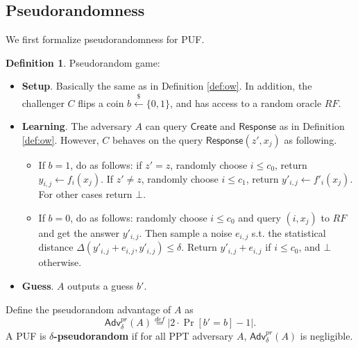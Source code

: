 \documentclass[12pt]{article}
\newcommand{\eqdef}{\stackrel{def}{=}}
\newcommand{\bits}{\{0,1\}}
\newcommand{\getsr}{\stackrel{\$}{\gets}}
\newcommand{\Adv}{\mathsf{Adv}}
\newcommand{\Create}{\mathsf{Create}}
\newcommand{\Response}{\mathsf{Response}}
\theoremstyle{definition}
\newtheorem{definition}[theorem]{Definition}
\begin{document}
\subsection{Pseudorandomness}
We first formalize pseudorandomness for PUF.
\begin{definition}
Pseudorandom game:
\begin{itemize}
\item {\bf Setup}. Basically the same as in Definition \ref{def:ow}. In addition, the challenger $C$ flips a coin $b \getsr \bits$, and has access to a random oracle $RF$.
\item {\bf Learning}. The adversary $A$ can query $\Create$ and $\Response$ as in Definition \ref{def:ow}. However, $C$ behaves on the query $\Response(z', x_j)$ as following.
	\begin{itemize}
	\item If $b=1$, do as follows: if $z'=z$, randomly choose $i \leq c_0$, return $y_{i,j} \gets f_i(x_j)$. If $z'\not= z$, randomly choose $i \leq c_1$, return $y'_{i,j} \gets f'_i(x_j)$. For other cases return $\bot$.
	\item If $b=0$, do as follows: randomly choose $i \leq c_0$ and query $(i, x_j)$ to $RF$ and get the answer $y'_{i,j}$. Then sample a noise $e_{i,j}$ s.t. the statistical distance $\Delta(y'_{i,j} + e_{i,j}, y'_{i,j}) \leq \delta$. Return $y'_{i,j} + e_{i,j}$ if $i\leq c_0$, and $\bot$ otherwise.
	\end{itemize}
\item {\bf Guess}. $A$ outputs a guess $b'$.
\end{itemize}
Define the pseudorandom advantage of $A$ as
$$\Adv_{\delta}^{pr}(A) \eqdef |2\cdot \Pr[b'=b] - 1|.$$
A PUF is {\bf $\delta$-pseudorandom} if for all PPT adversary $A$, $\Adv_{\delta}^{pr}(A)$ is negligible.
\end{definition}
\end{document}
